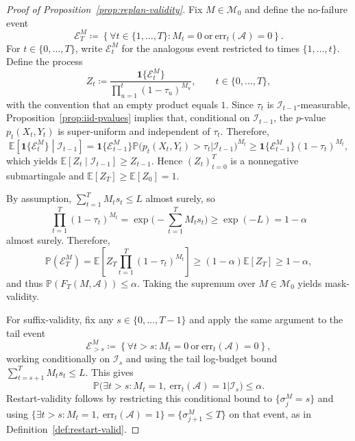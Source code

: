 \documentclass{uai2026} %
\newcommand{\1}{\mathbf{1}}
\newcommand{\ind}[1]{\mathbf{1}\{#1\}}
\newcommand{\prob}{\mathbb{P}}
\newcommand{\expec}{\mathbb{E}}
\newcommand{\err}{\mathrm{err}}
\newcommand{\mcal}{\mathcal{M}}
\newcommand{\acal}{\mathcal{A}}
\begin{document}
\begin{proof}[Proof of Proposition~\ref{prop:replan-validity}]
  Fix $M\in\mcal_0$ and define the no-failure event
  \begin{equation*}
    \mathcal{E}_T^{M}
    \coloneqq
    \left\{\forall t\in\{1,\dots,T\}\colon M_t=0\ \text{or}\ \err_t(\acal)=0\right\}.
  \end{equation*}
  For $t\in\{0,\dots,T\}$, write $\mathcal{E}_t^{M}$ for the analogous event restricted to times $\{1,\dots,t\}$.
  Define the process
  \begin{equation*}
    Z_t
    \coloneqq
    \frac{\ind{\mathcal{E}_t^{M}}}{\prod_{u=1}^{t} (1-\tau_u)^{M_u}},
    \qquad t\in\{0,\dots,T\},
  \end{equation*}
  with the convention that an empty product equals $1$.
  Since $\tau_t$ is $\mathcal{I}_{t-1}$-measurable, Proposition~\ref{prop:iid-pvalues} implies that, conditional on $\mathcal{I}_{t-1}$, the $p$-value $p_t(X_t,Y_t)$ is super-uniform and independent of $\tau_t$.
  Therefore,
  \begin{equation*}
    \expec\left[\ind{\mathcal{E}_t^{M}} \middle| \mathcal{I}_{t-1}\right]
    = \ind{\mathcal{E}_{t-1}^{M}}\prob\Big(p_t(X_t,Y_t)>\tau_t \Big| \mathcal{I}_{t-1}\Big)^{M_t}
    \ge \ind{\mathcal{E}_{t-1}^{M}}(1-\tau_t)^{M_t},
  \end{equation*}
  which yields $\expec[Z_t \mid \mathcal{I}_{t-1}]\ge Z_{t-1}$.
  Hence $(Z_t)_{t=0}^{T}$ is a nonnegative submartingale and $\expec[Z_T]\ge \expec[Z_0]=1$.

  By assumption, $\sum_{t=1}^{T} M_t s_t \le L$ almost surely, so
  \begin{equation*}
    \prod_{t=1}^{T} (1-\tau_t)^{M_t}
    = \exp\Big(-\sum_{t=1}^{T} M_t s_t\Big)
    \ge \exp(-L)
    = 1-\alpha
  \end{equation*}
  almost surely.
  Therefore,
  \begin{equation*}
    \prob(\mathcal{E}_T^{M})
    = \expec\left[Z_T\prod_{t=1}^{T} (1-\tau_t)^{M_t}\right]
    \ge (1-\alpha)\expec[Z_T]
    \ge 1-\alpha,
  \end{equation*}
  and thus $\prob(F_T(M,\acal))\le \alpha$.
  Taking the supremum over $M\in\mcal_0$ yields mask-validity.

  For suffix-validity, fix any $s\in\{0,\dots,T-1\}$ and apply the same argument to the tail event
  \begin{equation*}
    \mathcal{E}_{>s}^{M}
    \coloneqq
    \left\{\forall t>s\colon M_t=0\ \text{or}\ \err_t(\acal)=0\right\},
  \end{equation*}
  working conditionally on $\mathcal{I}_s$ and using the tail log-budget bound $\sum_{t=s+1}^{T} M_t s_t\le L$.
  This gives
  \begin{equation*}
    \prob\Big(\exists t>s\colon M_t=1,\ \err_t(\acal)=1 \Big| \mathcal{I}_s\Big)\le \alpha.
  \end{equation*}
  Restart-validity follows by restricting this conditional bound to $\{\sigma_j^{M}=s\}$ and using $\{\exists t>s\colon M_t=1,\ \err_t(\acal)=1\}=\{\sigma_{j+1}^{M}\le T\}$ on that event, as in Definition~\ref{def:restart-valid}.
\end{proof}\par\medskip
\end{document}

